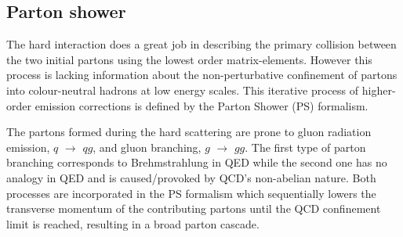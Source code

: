 
\subsection{Parton shower} \label{sec::PS}

The hard interaction does a great job in describing the primary collision between the two initial partons using the lowest order matrix-elements. However this process is lacking information about the non-perturbative confinement of partons into colour-neutral hadrons at low energy scales. This iterative process of higher-order emission corrections is defined by the Parton Shower (PS) formalism.

The partons formed during the hard scattering are prone to gluon radiation emission, $q$ $\rightarrow$ $qg$, and gluon branching, $g$ $\rightarrow$ $gg$. The first type of parton branching corresponds to Brehmstrahlung in QED while the second one has no analogy in QED and is caused/provoked by QCD's non-abelian nature. Both processes are incorporated in the PS formalism which sequentially lowers the transverse momentum of the contributing partons until the QCD confinement limit is reached, resulting in a broad parton cascade.
\\

